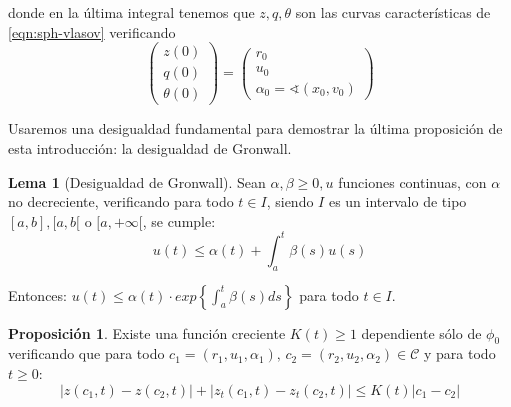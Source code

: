\documentclass[a4paper,10pt]{scrartcl}
\theoremstyle{definition}
\newtheorem{lemma}{Lema}
\newtheorem{fact}{Proposición}
\numberwithin{equation}{section}
\begin{document}
donde en la última integral tenemos que $z,q,\theta$ son las curvas características de \eqref{eqn:sph-vlasov} verificando 
\[
    \left(\begin{array}{c} z(0)\\ q(0)\\ \theta(0) \end{array}\right) = 
    \left(\begin{array}{c} r_0\\ u_0\\ \alpha_0 =\sphericalangle(x_0, v_0) \end{array}\right)
\]

Usaremos una desigualdad fundamental para demostrar la última proposición de esta introducción: la desigualdad de Gronwall.

\begin{lemma}[Desigualdad de Gronwall]
Sean $\alpha, \beta \ge 0, u$ funciones continuas, con $\alpha$ no decreciente, verificando para todo $t\in I$, siendo $I$ es un intervalo de tipo $[a,b], [a,b[$ o $[a,+\infty[$, se cumple:
\[
 u(t) \le \alpha(t) + \int_a^t \beta(s) u(s)
\]

Entonces: $u(t) \le \alpha(t) \cdot exp\left\{\int_a^t \beta(s) ds\right\}$ para todo $t\in I$.
\label{ineq:gronwall}
\end{lemma}

\begin{fact} \label{fact:ineq-curves}
 Existe una función creciente $K(t) \ge 1$ dependiente sólo de $\phi_0$ verificando que para todo $c_1=(r_1,u_1,\alpha_1), \, c_2=(r_2,u_2,\alpha_2) \in \mathcal{C}$ y para todo $t\ge 0$:
 \[|z(c_1,t) - z(c_2,t)| + |z_t(c_1,t) - z_t(c_2,t)| \le K(t)|c_1 - c_2|\]
\end{fact}
\end{document}

